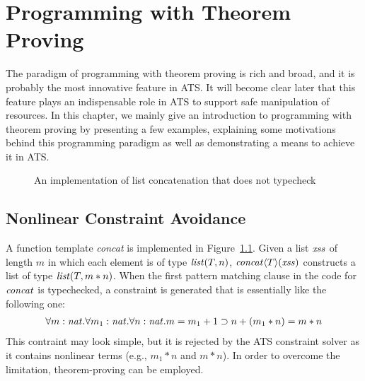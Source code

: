 \chapter{Programming with Theorem Proving}

The paradigm of programming with theorem proving is rich and broad, and it
is probably the most innovative feature in ATS. It will become clear later
that this feature plays an indispensable role in ATS to support safe
manipulation of resources. In this chapter, we mainly give an introduction
to programming with theorem proving by presenting a few examples,
explaining some motivations behind this programming paradigm as well as
demonstrating a means to achieve it in ATS.

\begin{figure}[thp]

\caption{An implementation of list concatenation that does not typecheck}
\label{figure:list_concat_function}
\end{figure}
\section{Nonlinear Constraint Avoidance}
A function template {\it concat} is implemented in
Figure~\ref{figure:list_concat_function}. Given a list ${\it xss}$ of
length $m$ in which each element is of type ${\it list}(T,n)$, ${\it
  concat}\langle{T}\rangle({\it xss})$ constructs a list of type
${\it list}(T,m*n)$. When the first pattern matching clause in the code for
${\it concat}$ is typechecked, a constraint is generated that is
essentially like the following one:
\[\begin{array}{l}
\forall{m:{\it nat}}.\forall{m_1:{\it nat}}.\forall{n:{\it nat}}. m=m_1+1\supset n+(m_1*n) = m*n \\
\end{array}\]
This contraint may look simple, but it is rejected by the ATS constraint
solver as it contains nonlinear terms (e.g., $m_1*n$ and $m*n$).
In order to overcome the limitation, theorem-proving can be employed.

